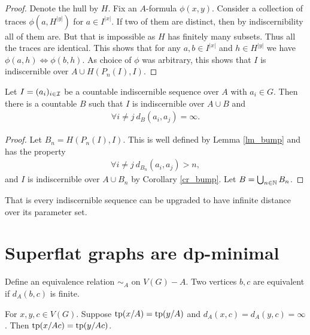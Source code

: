 \begin{proof}
  Denote the hull by $H$. Fix an $A$-formula $\phi(x,y)$. Consider a collection of traces $\phi(a, H^{|y|})$ for $a \in I^{|x|}$. If two of them are distinct, then by indiscernibility all of them are. But that is impossible as $H$ has finitely many subsets. Thus all the traces are identical. This shows that for any $a,b \in I^{|x|}$ and $h \in H^{|y|}$ we have $\phi(a, h) \iff \phi(b, h)$. As choice of $\phi$ was arbitrary, this shows that $I$ is indiscernible over $A \cup H(P_n(I), I)$.
\end{proof}

\begin{Corollary} \label{inf_dis}
  Let $I = (a_i)_{i \in \operatorname{\mathcal I}}$ be a countable indiscernible sequence over $A$ with $a_i \in G$.
  Then there is a countable $B$ such that $I$ is indiscernible over $A \cup B$ and
  \begin{align*}
    \forall i \neq j \ d_B(a_i, a_j) = \infty.
  \end{align*}
\end{Corollary}

\begin{proof}
  Let $B_n = H(P_n(I), I)$. This is well defined by Lemma \ref{lm_bump} and has the property
  \begin{align*}
    \forall i \neq j \ d_{B_n}(a_i, a_j) > n,
  \end{align*}
  and $I$ is indiscernible over $A \cup B_n$ by Corollary \ref{cr_bump}. Let $B = \bigcup_{n \in \mathbb{N}} B_n$.
\end{proof}

That is every indiscernible sequence can be upgraded to have infinite distance over its parameter set.

\section{Superflat graphs are dp-minimal}

\begin{Definition}
  Define an equivalence relation $\sim_A$ on $V(G) - A$.
  Two vertices $b,c$ are equivalent if $d_A(b,c)$ is finite.
\end{Definition}

\begin{Lemma}
  For $x,y,c \in V(G)$.
  Suppose $\operatorname{tp}(x/A) = \operatorname{tp}(y/A)$ and $d_A(x, c) = d_A(y, c) = \infty$.
  Then $\operatorname{tp}(x/Ac) = \operatorname{tp}(y/Ac)$.
\end{Lemma}

